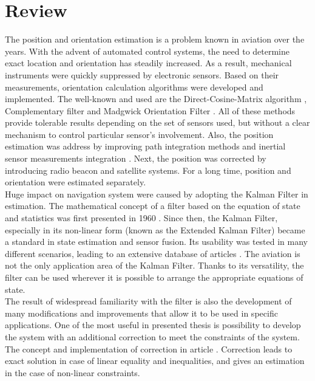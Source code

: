 \chapter{Review}

The position and orientation estimation is a problem known in aviation over the years. With the advent of automated control systems, the need to determine exact location and orientation has steadily increased. As a result, mechanical instruments were quickly suppressed by electronic sensors. Based on their measurements, orientation calculation algorithms were developed and implemented. The well-known and used are the Direct-Cosine-Matrix algorithm \cite{dcm}, Complementary filter \cite{complementary} and Madgwick Orientation Filter \cite{madgwick} \cite{Hasan2020}. All of these methods provide tolerable results depending on the set of sensors used, but without a clear mechanism to control particular sensor's involvement.
Also, the position estimation was address by improving path integration methods and inertial sensor measurements integration \cite{farrell2012integrated}. Next, the position was corrected by introducing radio beacon and satellite systems. For a long time, position and orientation were estimated separately.\\

Huge impact on navigation system were caused by adopting the Kalman Filter in estimation. The mathematical concept of a filter based on the equation of state and statistics was first presented in 1960 \cite{kalman}. Since then, the Kalman Filter, especially in its non-linear form (known as the Extended Kalman Filter) became a standard in state estimation and sensor fusion. Its usability was tested in many different scenarios, leading to an extensive database of articles \cite{ekf_poor} \cite{s16020264} \cite{s120709566}. The aviation is not the only application area of the Kalman Filter. Thanks to its versatility, the filter can be used wherever it is possible to arrange the appropriate equations of state.\\

The result of widespread familiarity with the filter is also the development of many modifications and improvements that allow it to be used in specific applications. One of the most useful in presented thesis is possibility to develop the system with an additional correction to meet the constraints of the system. The concept and implementation of correction in article \cite{simon}. Correction leads to exact solution in case of linear equality and inequalities, and gives an estimation in the case of non-linear constraints.\\


